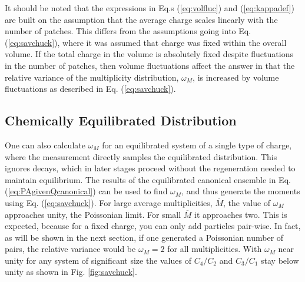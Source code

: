 \documentclass[aps,prc,nofootinbib,showpacs,superscriptaddress,groupedaddress]{revtex4-1}
\begin{document}
It should be noted that the expressions in Eq.s (\ref{eq:volfluc}) and (\ref{eq:kappadef}) are built on the assumption that the average charge scales linearly with the number of patches. This differs from the assumptions going into Eq. (\ref{eq:savchuck}), where it was assumed that charge was fixed within the overall volume. If the total charge in the volume is absolutely fixed despite fluctuations in the number of patches, then volume fluctuations affect the answer in that the relative variance of the multiplicity distribution, $\omega_M$, is increased by volume fluctuations as described in Eq. (\ref{eq:savchuck}).

\subsection{Chemically Equilibrated Distribution}

One can also calculate $\omega_M$ for an equilibrated system of a single type of charge, where the measurement directly samples the equilibrated distribution. This ignores decays, which in later stages proceed without the regeneration needed to maintain equilibrium. The results of the equilibrated canonical ensemble in Eq. (\ref{eq:PAgivenQcanonical}) can be used to find $\omega_M$, and thus generate the moments using Eq. (\ref{eq:savchuck}). For large average multiplicities, $\overline{M}$, the value of $\omega_M$ approaches unity, the Poissonian limit. For small $\overline{M}$ it approaches two. This is expected, because for a fixed charge, you can only add particles pair-wise. In fact, as will be shown in the next section, if one generated a Poissonian number of pairs, the relative variance would be $\omega_M=2$ for all multiplicities. With $\omega_M$ near unity for any system of significant size the values of $C_4/C_2$ and $C_3/C_1$ stay below unity as shown in Fig. \ref{fig:savchuck}. 
\end{document}
